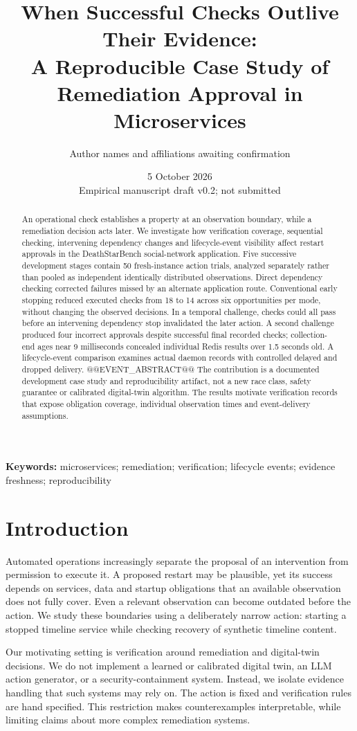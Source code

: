\documentclass[11pt]{article}
\title{When Successful Checks Outlive Their Evidence:\\A Reproducible Case Study of Remediation Approval in Microservices}
\author{Author names and affiliations awaiting confirmation}
\date{5 October 2026\\Empirical manuscript draft v0.2; not submitted}
\begin{document}
\maketitle
\begin{abstract}
An operational check establishes a property at an observation boundary, while a remediation decision acts later. We investigate how verification coverage, sequential checking, intervening dependency changes and lifecycle-event visibility affect restart approvals in the DeathStarBench social-network application. Five successive development stages contain 50 fresh-instance action trials, analyzed separately rather than pooled as independent identically distributed observations. Direct dependency checking corrected failures missed by an alternate application route. Conventional early stopping reduced executed checks from 18 to 14 across six opportunities per mode, without changing the observed decisions. In a temporal challenge, checks could all pass before an intervening dependency stop invalidated the later action. A second challenge produced four incorrect approvals despite successful final recorded checks; collection-end ages near 9 milliseconds concealed individual Redis results over 1.5 seconds old. A lifecycle-event comparison examines actual daemon records with controlled delayed and dropped delivery. @@EVENT_ABSTRACT@@ The contribution is a documented development case study and reproducibility artifact, not a new race class, safety guarantee or calibrated digital-twin algorithm. The results motivate verification records that expose obligation coverage, individual observation times and event-delivery assumptions.
\end{abstract}
\noindent\textbf{Keywords:} microservices; remediation; verification; lifecycle events; evidence freshness; reproducibility

\section{Introduction}
Automated operations increasingly separate the proposal of an intervention from permission to execute it. A proposed restart may be plausible, yet its success depends on services, data and startup obligations that an available observation does not fully cover. Even a relevant observation can become outdated before the action. We study these boundaries using a deliberately narrow action: starting a stopped timeline service while checking recovery of synthetic timeline content.

Our motivating setting is verification around remediation and digital-twin decisions. We do not implement a learned or calibrated digital twin, an LLM action generator, or a security-containment system. Instead, we isolate evidence handling that such systems may rely on. The action is fixed and verification rules are hand specified. This restriction makes counterexamples interpretable, while limiting claims about more complex remediation systems.
\end{document}
